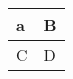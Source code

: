 \documentclass{article}
\begin{document}
             \begin{tabular}{ |l|l| }
                 \hline
                        a & B \\ \hline
                        C & D \\
                 \hline
             \end{tabular}
   
\end{document}
